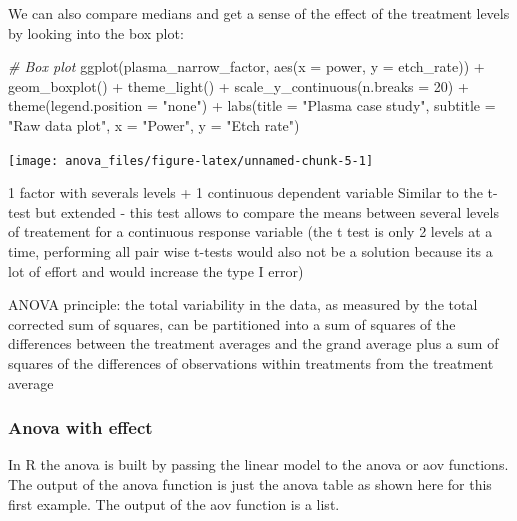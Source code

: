 \documentclass[
]{book}
\newenvironment{Shaded}{\begin{snugshade}}{\end{snugshade}}
\newcommand{\AttributeTok}[1]{\textcolor[rgb]{0.77,0.63,0.00}{#1}}
\newcommand{\CommentTok}[1]{\textcolor[rgb]{0.56,0.35,0.01}{\textit{#1}}}
\newcommand{\DecValTok}[1]{\textcolor[rgb]{0.00,0.00,0.81}{#1}}
\newcommand{\FunctionTok}[1]{\textcolor[rgb]{0.00,0.00,0.00}{#1}}
\newcommand{\NormalTok}[1]{#1}
\newcommand{\SpecialCharTok}[1]{\textcolor[rgb]{0.00,0.00,0.00}{#1}}
\newcommand{\StringTok}[1]{\textcolor[rgb]{0.31,0.60,0.02}{#1}}
\begin{document}
We can also compare medians and get a sense of the effect of the treatment levels by looking into the box plot:

\begin{Shaded}
\begin{Highlighting}[]
\CommentTok{\# Box plot}
\FunctionTok{ggplot}\NormalTok{(plasma\_narrow\_factor, }\FunctionTok{aes}\NormalTok{(}\AttributeTok{x =}\NormalTok{ power, }\AttributeTok{y =}\NormalTok{ etch\_rate)) }\SpecialCharTok{+}
  \FunctionTok{geom\_boxplot}\NormalTok{() }\SpecialCharTok{+}
  \FunctionTok{theme\_light}\NormalTok{() }\SpecialCharTok{+}
  \FunctionTok{scale\_y\_continuous}\NormalTok{(}\AttributeTok{n.breaks =} \DecValTok{20}\NormalTok{) }\SpecialCharTok{+}
  \FunctionTok{theme}\NormalTok{(}\AttributeTok{legend.position =} \StringTok{"none"}\NormalTok{) }\SpecialCharTok{+}
  \FunctionTok{labs}\NormalTok{(}\AttributeTok{title =} \StringTok{"Plasma case study"}\NormalTok{,}
       \AttributeTok{subtitle =} \StringTok{"Raw data plot"}\NormalTok{,}
       \AttributeTok{x =} \StringTok{"Power"}\NormalTok{,}
       \AttributeTok{y =} \StringTok{"Etch rate"}\NormalTok{)}
\end{Highlighting}
\end{Shaded}

\texttt{[image: anova\_files/figure-latex/unnamed-chunk-5-1]}

1 factor with severals levels + 1 continuous dependent variable
Similar to the t-test but extended - this test allows to compare the means between several levels of treatement for a continuous response variable (the t test is only 2 levels at a time, performing all pair wise t-tests would also not be a solution because its a lot of effort and would increase the type I error)

ANOVA principle: the total variability in the data, as measured by the total corrected sum of squares, can be partitioned into a sum of squares of the differences between the treatment averages and the grand average plus a sum of squares of the differences of observations within treatments from the treatment average

\hypertarget{anova}{%
\subsubsection{Anova with effect}\label{anova}}

In R the anova is built by passing the linear model to the anova or aov functions.
The output of the anova function is just the anova table as shown here for this first example. The output of the aov function is a list.
\end{document}
